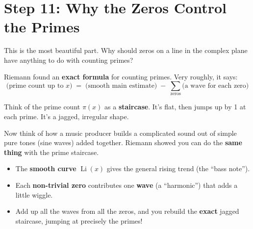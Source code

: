 \documentclass[11pt,a4paper]{article}
\newcommand{\Li}{\operatorname{Li}}
\begin{document}
\section{Step 11: Why the Zeros Control the Primes}

This is the most beautiful part. Why should zeros on a line in the complex plane have anything to do with counting primes?

Riemann found an \textbf{exact formula} for counting primes. Very roughly, it says:
\[
\big(\text{prime count up to } x\big) \;=\; \big(\text{smooth main estimate}\big) \;-\; \sum_{\text{zeros}} \big(\text{a wave for each zero}\big)
\]

\begin{analogy}
Think of the prime count $\pi(x)$ as a \textbf{staircase}. It's flat, then jumps up by 1 at each prime. It's a jagged, irregular shape.

Now think of how a music producer builds a complicated sound out of simple pure tones (sine waves) added together. Riemann showed you can do the \textbf{same thing} with the prime staircase.
\end{analogy}

\begin{center}
\end{center}

\begin{itemize}[itemsep=2pt]
  \item The \textbf{smooth curve} $\Li(x)$ gives the general rising trend (the ``bass note'').
  \item Each \textbf{non-trivial zero} contributes one \textbf{wave} (a ``harmonic'') that adds a little wiggle.
  \item Add up all the waves from all the zeros, and you rebuild the \textbf{exact} jagged staircase, jumping at precisely the primes!
\end{itemize}
\end{document}
